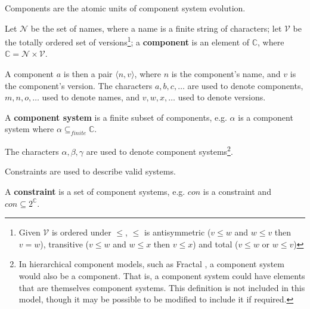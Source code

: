 Components are the atomic units of component system evolution.
\begin{defs}
\label{formal.componentdef}
Let $\mathcal{N}$ be the set of names, where a name is a finite string of characters; 
let $\mathcal{V}$ be the totally ordered set of versions\footnote{Given $\mathcal{V}$ is ordered under 
$\leq$, $\leq$ is antisymmetric ($v \leq w$ and $w \leq v$ then $v = w$), transitive ($v \leq w$ and $w \leq x$ then $v \leq x$) and total ($v \leq w$ or $w \leq v$)}; 
a \textbf{component}
is an element of $\mathbb{C}$, where $\mathbb{C} = \mathcal{N} \times \mathcal{V}$.
\end{defs}
A component $a$ is then a pair $\langle n,v \rangle$, where $n$ is the component's name, and $v$ is the component's version.
The characters  $a,b,c,\ldots$ are used to denote components, $m,n,o,\ldots$ used to denote names, and $v,w,x,\ldots$ used to denote versions.

\begin{defs}
\label{formal.componentsystemdef}
A \textbf{component system} is a finite subset of components, e.g. $\alpha$ is a component system where $\alpha \subseteq_{finite} \mathbb{C}$. 
\end{defs}
The characters $\alpha,\beta,\gamma$ are used to denote component systems\footnote{In hierarchical component models, such as Fractal \citep{Quma2006}, 
a component system would also be a component.
That is, a component system could have elements that are themselves component systems.
This definition is not included in this model, though it may be possible to be modified to include it if required.}.

Constraints are used to describe valid systems.
\begin{defs}
\label{formal.constraintdefs}
A \textbf{constraint} is a set of component systems, e.g. $con$ is a constraint and $con \subseteq 2^{\mathbb{C}}$.
\end{defs}

